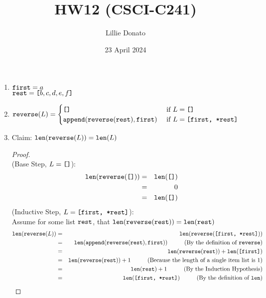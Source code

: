 \documentclass{article}
\title{HW12 (CSCI-C241)}
\author{Lillie Donato}
\date{23 April 2024}
\begin{document}
\maketitle

\begin{enumerate}
    \item $\verb|first| = a$ \\ $\verb|rest| = \verb|[| b,c,d,e,f \verb|]|$
    \item $\verb|reverse|(L) = \begin{cases}
        \verb|[]| &\text{ if } L = \verb|[]| \\
        \verb|append|(\verb|reverse|(\verb|rest|), \verb|first|) &\text{ if } L = \verb|[first, *rest]|
    \end{cases}$
    \item Claim: $\verb|len|(\verb|reverse|(L)) = \verb|len|(L)$
    \begin{proof}
        \text{} \\
        (Base Step, $L = \verb|[]|$):
        \begin{eqnarray}
            \verb|len|(\verb|reverse|(\verb|[]|)) &=& \verb|len|(\verb|[]|) \\
            &=& 0 \\
            &=& \verb|len|(\verb|[]|)
        \end{eqnarray}
        (Inductive Step, $L = \verb|[first, *rest]|$): \\
        Assume for some list $\verb|rest|$, that $\verb|len|(\verb|reverse|(\verb|rest|)) = \verb|len|(\verb|rest|)$
        \begin{eqnarray}
            \verb|len|(\verb|reverse|(L)) &=& \verb|len|(\verb|reverse|(\verb|[first, *rest]|)) \\
            &=& \verb|len|(\verb|append|(\verb|reverse|(\verb|rest|), \verb|first|)) \hspace{1cm} \text{(By the definition of } \verb|reverse| \text{)}\\
            &=& \verb|len|(\verb|reverse|(\verb|rest|)) + \verb|len|(\verb|[first]|) \\
            &=& \verb|len|(\verb|reverse|(\verb|rest|)) + 1 \hspace{1cm} \text{(Because the length of a single item list is $1$)} \\
            &=& \verb|len|(\verb|rest|) + 1 \hspace{1cm} \text{(By the Induction Hypothesis)} \\
            &=& \verb|len|(\verb|[first, *rest]|) \hspace{1cm} \text{(By the definition of } \verb|len| \text{)}\\

\end{eqnarray}
\end{proof}
\end{enumerate}
\end{document}
